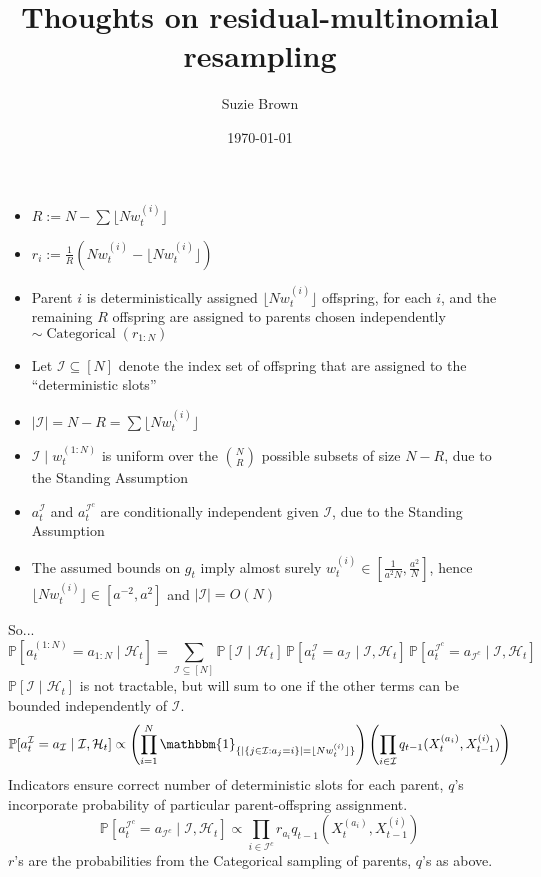 \documentclass{article}
\title{Thoughts on residual-multinomial resampling}
\author{Suzie Brown}
\date{\today}
\newcommand{\Prob}{\mathbb{P}}
\newcommand{\I}[1]{\mathbbm{1}_{\{#1\}}}
\newcommand{\1}[1]{\mathbbm{1}_{#1}}
\newcommand{\flnw}[1][i]{\lfloor N w_t^{(#1)} \rfloor}
\newcommand{\Cat}{\operatorname{Categorical}}
\begin{document}
\maketitle
\thispagestyle{fancy}

\begin{itemize}
\item $R:= N - \sum \flnw$ 
\item $r_i := \frac{1}{R} ( Nw_t^{(i)} - \flnw )$
\item Parent $i$ is deterministically assigned $\flnw$ offspring, for each $i$, and the remaining $R$ offspring are assigned to parents chosen independently $\sim \Cat(r_{1:N})$
\item Let $\mathcal{I} \subseteq [N]$ denote the index set of offspring that are assigned to the ``deterministic slots''
\item $|\mathcal{I}| = N-R = \sum \flnw$
\item $\mathcal{I} \mid w_t^{(1:N)}$ is uniform over the $\binom{N}{R}$ possible subsets of size $N-R$, due to the Standing Assumption
\item $a_t^{\mathcal{I}}$ and $a_t^{\mathcal{I}^c}$ are conditionally independent given $\mathcal{I}$, due to the Standing Assumption
\item The assumed bounds on $g_t$ imply almost surely $w_t^{(i)} \in [ \frac{1}{a^2 N}, \frac{a^2}{N} ]$, hence $\flnw \in [a^{-2}, a^2] $ and $|\mathcal{I}|= O(N)$
\end{itemize}
So...
\begin{equation}
\Prob[ a_t^{(1:N)} = a_{1:N} \mid \mathcal{H}_t ]
= \sum_{\mathcal{I}\subseteq[N]} \Prob[ \mathcal{I} \mid \mathcal{H}_t ]
        \, \Prob[ a_t^{\mathcal{I}} = a_{\mathcal{I}} \mid \mathcal{I}, \mathcal{H}_t ]
        \, \Prob[ a_t^{\mathcal{I}^c} = a_{\mathcal{I}^c} \mid \mathcal{I}, \mathcal{H}_t ]
\end{equation}
$\Prob[ \mathcal{I} \mid \mathcal{H}_t ]$ is not tractable, but will sum to one if the other terms can be bounded independently of $\mathcal{I}$.
\begin{equation}
\Prob[ a_t^{\mathcal{I}} = a_{\mathcal{I}} \mid \mathcal{I}, \mathcal{H}_t ]
\propto \left( \prod_{i=1}^N \I{ |\{ j \in \mathcal{I} : a_j =i \}| = \flnw } \right)
        \left( \prod_{i\in\mathcal{I}} q_{t-1}(X_t^{(a_i)}, X_{t-1}^{(i)} ) \right)
\end{equation}
Indicators ensure correct number of deterministic slots for each parent, $q$'s incorporate probability of particular parent-offspring assignment.
\begin{equation}
\Prob[ a_t^{\mathcal{I}^c} = a_{\mathcal{I}^c} \mid \mathcal{I}, \mathcal{H}_t ]
\propto \prod_{i\in\mathcal{I}^c} r_{a_i} q_{t-1}(X_t^{(a_i)}, X_{t-1}^{(i)} ) 
\end{equation}
$r$'s are the probabilities from the Categorical sampling of parents, $q$'s as above.
\end{document}
